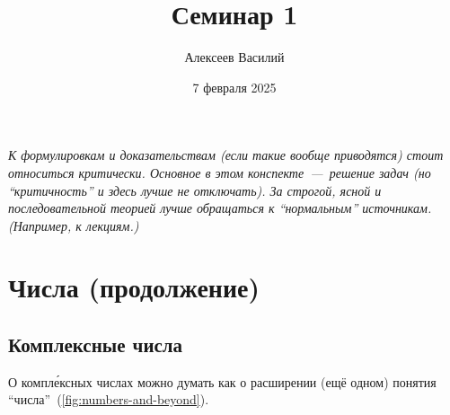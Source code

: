 \documentclass[a4paper,12pt]{article}
\author{Алексеев Василий}
\title{Семинар 1}
\date{7 февраля 2025}
\begin{document}
  \maketitle
  
  \tableofcontents

  \thispagestyle{empty}
  
  \newpage
  
  
  
  \vspace*{\fill}
  
  \noindent
  \emph{
    К формулировкам и доказательствам (если такие вообще приводятся) стоит относиться критически.
    Основное в этом конспекте~---~решение задач (но ``критичность'' и здесь лучше не отключать).
    За строгой, ясной и последовательной теорией лучше обращаться к ``нормальным'' источникам.
    (Например, к лекциям.)
  }
  
  \vspace*{\fill}
  
  \thispagestyle{empty}
  
  \newpage
  
  


  \section{Числа (продолжение)}

  \subsection{Комплексные числа}
  
  
  

  О компл\'{е}ксных числах можно думать как о расширении (ещё одном) понятия ``числа''~(\ref{fig:numbers-and-beyond}).
\end{document}
